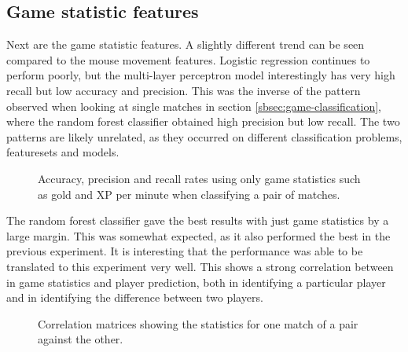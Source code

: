 \documentclass[Report.tex]{subfiles}
\newcommand{\baraxis}[8]{
\begin{axis}[
    ybar,
    title={#1},
    width=#5,
    height=#6,
    ymin=#3, ymax=#4,
    bar width=1em,
    legend style={at={#7},anchor=north,legend columns=-1},
    enlarge x limits=0.4,
    x tick label style={align=center,text width=#8},
    symbolic x coords={Logistic Regression, Random Forest, Multi-layer Perceptron},
    xtick=data,
    ylabel={#2}
]
}
\newcommand{\plotbar}[5]{
\addplot+[
	discard if not={numSplits}{#1},
	discard if not={split}{#2},
	discard if not={features}{#3},
] table [x=model, y=#4,col sep=comma] {data/19-pair-cv.csv};
\addlegendentry{#5}
}
\begin{document}

\subsection{Game statistic features}
Next are the game statistic features. A slightly different trend can be seen compared to the mouse movement features. Logistic regression continues to perform poorly, but the multi-layer perceptron model interestingly has very high recall but low accuracy and precision. This was the inverse of the pattern observed when looking at single matches in section \ref{sbsec:game-classification}, where the random forest classifier obtained high precision but low recall. The two patterns are likely unrelated, as they occurred on different classification problems, featuresets and models.


\begin{figure}[H]
\centering
{}
\caption{Accuracy, precision and recall rates using only game statistics such as gold and XP per minute when classifying a pair of matches.}
\end{figure}

The random forest classifier gave the best results with just game statistics by a large margin. This was somewhat expected, as it also performed the best in the previous experiment. It is interesting that the performance was able to be translated to this experiment very well. This shows a strong correlation between in game statistics and player prediction, both in identifying a particular player and in identifying the difference between two players. 

\begin{figure}[H]
\vspace{-2cm}
\begin{subfigure}{1\textwidth}
\end{subfigure}

\begin{subfigure}{1\textwidth}
\end{subfigure}
\caption{Correlation matrices showing the statistics for one match of a pair against the other.}
\label{fig:stats-correlation}
\end{figure}
\end{document}
